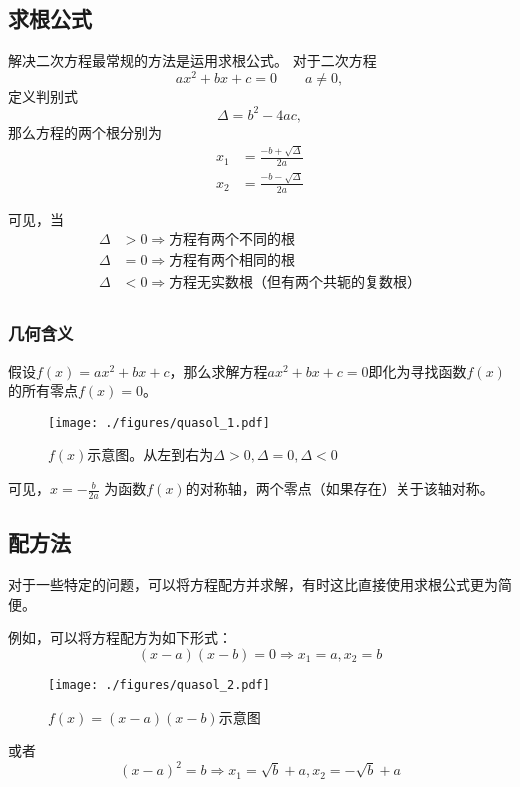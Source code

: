 
\subsection{求根公式}
解决二次方程最常规的方法是运用求根公式。
对于二次方程$$ax^2+bx+c=0 \qquad a\neq 0,$$定义判别式$$\Delta = b^2-4ac,$$那么方程的两个根分别为$$
\begin{aligned}
x_1&=\frac{-b+\sqrt{\Delta}}{2a}\\
x_2&=\frac{-b-\sqrt{\Delta}}{2a}
\end{aligned}
$$

可见，当
$$
\begin{aligned}
\Delta &> 0 \Rightarrow \text{方程有两个不同的根}\\
\Delta &= 0 \Rightarrow \text{方程有两个相同的根}\\
\Delta &< 0 \Rightarrow \text{方程无实数根（但有两个共轭的复数根）}\\
\end{aligned}
$$

\subsubsection{几何含义}
假设$f(x)=ax^2+bx+c$，那么求解方程$ax^2+bx+c=0$即化为寻找函数$f(x)$的所有零点$f(x)=0$。
\begin{figure}[ht]
\centering
\texttt{[image: ./figures/quasol\_1.pdf]}
\caption{$f(x)$示意图。从左到右为$\Delta > 0, \Delta = 0, \Delta < 0$} \label{quasol_fig1}
\end{figure}
可见，$x=-\frac{b}{2a}$ 为函数$f(x)$的对称轴，两个零点（如果存在）关于该轴对称。

\subsection{配方法}
对于一些特定的问题，可以将方程配方并求解，有时这比直接使用求根公式更为简便。

例如，可以将方程配方为如下形式：
$$(x-a)(x-b)=0\Rightarrow x_1=a, x_2=b$$
\begin{figure}[ht]
\centering
\texttt{[image: ./figures/quasol\_2.pdf]}
\caption{$f(x)=(x-a)(x-b)$示意图} \label{quasol_fig2}
\end{figure}

或者
$$(x-a)^2=b\Rightarrow x_1=\sqrt{b}+a, x_2=-\sqrt{b}+a$$